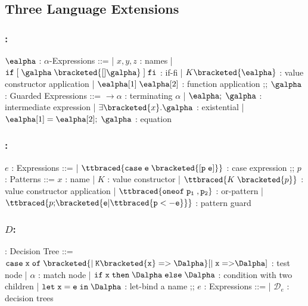 \documentclass[]{article}
\begin{document}
\subsection{Three Language Extensions}

\subsubsection{\Vminus:}

\begin{center}
    \begin{bnf}
    $\ealpha$ : \textsf{$\alpha$-Expressions} ::=
    | $x, y, z$ : names
    | $\tt{if} \; \tt{[}\; \galpha \; \bracketed{[] \galpha} \;\tt{]} \; \tt{fi}$ : if-fi 
    | $K \bracketed{\ealpha}$ : value constructor application 
    | $\ealpha[1] \; \ealpha[2]$ : function application 
    ;;
    $\galpha$ : \textsf{Guarded Expressions} ::=  
    $\boldsymbol{\rightarrow}\alpha$ : terminating $\alpha$ 
    | $\ealpha; \; \galpha$ : intermediate expression 
    | $\exists \bracketed{x} \tt{.} \galpha$ : existential 
    | $\ealpha[1] = \ealpha[2]; \; \galpha$ : equation 
    \end{bnf}
\end{center}

\bigskip 

\subsubsection{\Pplus:}
\begin{center}
    \begin{bnf}
$e$ : \textsf{Expressions} ::=
    | $\ttbraced{\tt{case} \; e \; \bracketed{\tt{[} p \; e \tt{]}}}$ : case expression 
    ;;
    $p$ : \textsf{Patterns} ::= $x$ : name 
    | $K$ : value constructor 
    | $\ttbraced{K \; \bracketed{p}}$ : value constructor application 
    | $\ttbraced{\tt{oneof} \; p_{1} \;, p_{2} }$ : or-pattern 
    | $\ttbraced{p \tt{;} \bracketed{e \vert \ttbraced{p  <- e}}}$ : pattern guard
    \end{bnf}
\end{center}


\bigskip 

\subsubsection{$D$:}

\begin{center}
    \begin{bnf}
        \Dalpha : \textsf{Decision Tree} ::= 
        $\tt{case} \; x \; \tt{of} \; 
        \bracketed{\vert \; K\bracketed{x} \; \tt{=>} \; \Dalpha}
        [\vert \; x \; \tt{=>} \Dalpha]$ : test node 
        | $\alpha$ : match node 
        | $\tt{if} \; x \; \tt{then} \; \Dalpha \; \tt{else} \; \Dalpha$ : condition with two children 
        | $\tt{let} \; x \; \tt{=} \; e \; \tt{in} \; \Dalpha$ : let-bind a name
        ;;
        $e$ : \textsf{Expressions} ::=
        | $\mathcal{D}_{e}$ : decision trees 
    \end{bnf}
\end{center}
\end{document}
